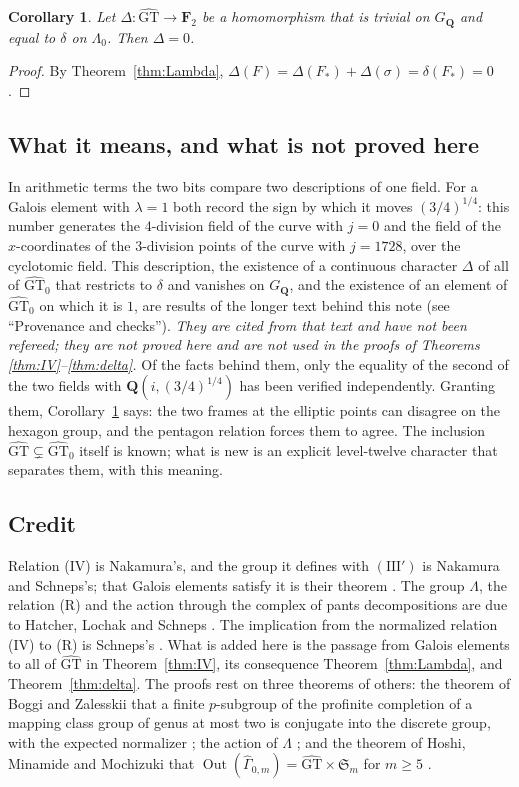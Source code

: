 \documentclass[11pt,a4paper]{article}
\theoremstyle{plain}
\newtheorem{corollary}[theorem]{Corollary}
\theoremstyle{definition}
\theoremstyle{remark}
\newcommand{\GT}{\widehat{\mathrm{GT}}}
\newcommand{\GTz}{\widehat{\mathrm{GT}}_0}
\newcommand{\Q}{\mathbf Q}
\newcommand{\F}{\mathbf F}
\newcommand{\GQ}{G_{\mathbf Q}}
\newcommand{\Gh}{\widehat\Gamma}
\newcommand{\Out}{\operatorname{Out}}
\begin{document}
\begin{corollary}\label{cor:Delta}
Let $\Delta:\GT\to\F_2$ be a homomorphism that is trivial on $\GQ$ and equal to $\delta$ on $\Lambda_0$. Then
$\Delta=0$.
\end{corollary}

\begin{proof}
By Theorem~\ref{thm:Lambda}, $\Delta(F)=\Delta(F_*)+\Delta(\sigma)=\delta(F_*)=0$.
\end{proof}

\subsection*{What it means, and what is not proved here}
In arithmetic terms the two bits compare two descriptions of one field. For a Galois element with $\lambda=1$ both
record the sign by which it moves $(3/4)^{1/4}$: this number generates the $4$-division field of the curve with
$j=0$ and the field of the $x$-coordinates of the $3$-division points of the curve with $j=1728$, over the
cyclotomic field. This description, the existence of a continuous character $\Delta$ of all of $\GTz$ that
restricts to $\delta$ and vanishes on $\GQ$, and the existence of an element of $\GTz$ on which it is $1$, are
results of the longer text behind this note (see ``Provenance and checks''). \emph{They are cited from that text and
have not been refereed; they are not proved here and are not used in the proofs of Theorems
\ref{thm:IV}--\ref{thm:delta}.} Of the facts behind them, only the equality of the second of the two fields with
$\Q(i,(3/4)^{1/4})$ has been verified independently. Granting them, Corollary~\ref{cor:Delta}
says: the two frames at the elliptic points can disagree on the hexagon group, and the pentagon relation forces
them to agree. The inclusion $\GT\subsetneq\GTz$ itself is known; what is new is an explicit level-twelve character
that separates them, with this meaning.

\subsection*{Credit}
Relation (IV) is Nakamura's, and the group it defines with $(\mathrm{III}')$ is Nakamura and Schneps's; that Galois
elements satisfy it is their theorem \cite[\S1]{NS}. The group $\Lambda$, the relation (R) and the action through
the complex of pants decompositions are due to Hatcher, Lochak and Schneps \cite{HLS}. The implication from the
normalized relation (IV) to (R) is Schneps's \cite[p.~670]{S}. What is added here is the passage from Galois
elements to all of $\GT$ in Theorem~\ref{thm:IV}, its consequence Theorem~\ref{thm:Lambda}, and
Theorem~\ref{thm:delta}. The proofs rest on three theorems of others: the theorem of Boggi and Zalesskii that a
finite $p$-subgroup of the profinite completion of a mapping class group of genus at most two is conjugate into the
discrete group, with the expected normalizer \cite{BZ}; the action of $\Lambda$ \cite{HLS}; and the theorem of
Hoshi, Minamide and Mochizuki that $\Out(\Gh_{0,m})=\GT\times\mathfrak S_m$ for $m\ge5$
\cite[Corollary C]{HMM}.
\end{document}
